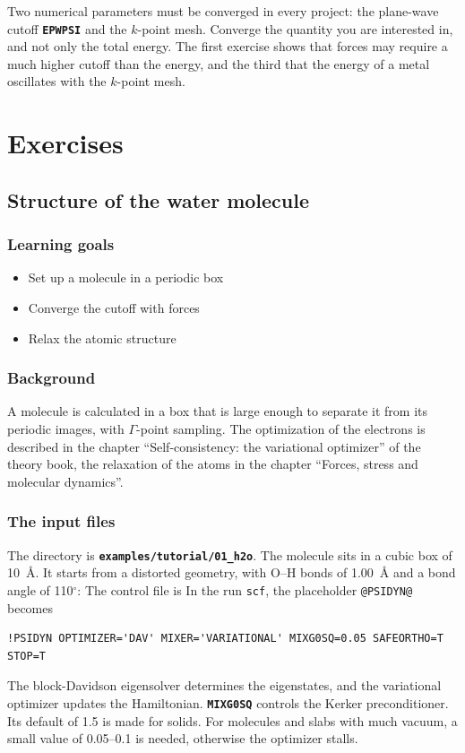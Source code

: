 \documentclass[11pt,a4paper,oneside]{book}
\newcommand{\key}[1]{\textbf{\texttt{#1}}}
\newcommand{\file}[1]{\textbf{\texttt{#1}}}
\newcommand{\deck}[1]{{\small}}
\newcommand{\goals}{\section{Learning goals}}
\newcommand{\background}{\section{Background}}
\begin{document}
Two numerical parameters must be converged in every project: the
plane-wave cutoff \key{EPWPSI} and the $k$-point mesh. Converge the
quantity you are interested in, and not only the total energy. The
first exercise shows that forces may require a much higher cutoff than
the energy, and the third that the energy of a metal oscillates with
the $k$-point mesh.

\part{Exercises}

\chapter{Structure of the water molecule}
\minitoc

\goals
\begin{itemize}
\item Set up a molecule in a periodic box
\item Converge the cutoff with forces
\item Relax the atomic structure
\end{itemize}

\background
A molecule is calculated in a box that is large enough to separate it
from its periodic images, with $\Gamma$-point sampling. The optimization
of the electrons is described in the chapter ``Self-consistency: the
variational optimizer'' of the theory book, the relaxation of the atoms
in the chapter ``Forces, stress and molecular dynamics''.

\section{The input files}

The directory is \file{examples/tutorial/01\_h2o}. The molecule sits in
a cubic box of 10~\AA. It starts from a distorted geometry, with O--H
bonds of 1.00~\AA{} and a bond angle of 110$^\circ$:
\deck{../../../examples/tutorial/01_h2o/h2o.strc}
The control file is
\deck{../../../examples/tutorial/01_h2o/h2o.cntl}
In the run \texttt{scf}, the placeholder \texttt{@PSIDYN@} becomes
\begin{verbatim}
!PSIDYN OPTIMIZER='DAV' MIXER='VARIATIONAL' MIXG0SQ=0.05 SAFEORTHO=T STOP=T
\end{verbatim}
The block-Davidson eigensolver determines the eigenstates, and the
variational optimizer updates the Hamiltonian. \key{MIXG0SQ} controls the
Kerker preconditioner. Its default of 1.5 is made for solids. For
molecules and slabs with much vacuum, a small value of 0.05--0.1 is
needed, otherwise the optimizer stalls.
\end{document}

